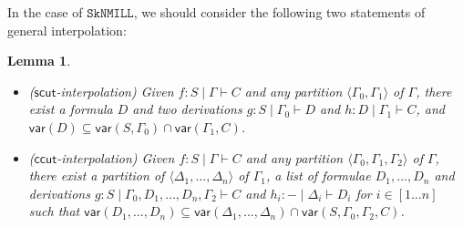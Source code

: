 \documentclass[sn-mathphys-num]{sn-jnl}%
\newcommand{\GG}{\Gamma}
\newcommand{\GD}{\Delta}
\newcommand{\vdG}{\vdash}
\newcommand{\SkNMILL}{$\mathtt{SkNMILL}$}
\newcommand{\mf}[1]{\mathsf{#1}}
\newcommand{\vars}[1]{\mathsf{var}(#1)}
\theoremstyle{thmstyleone}%
\theoremstyle{thmstyletwo}%
\newtheorem{lemma}{Lemma}
\theoremstyle{thmstylethree}%
\begin{document}
In the case of \SkNMILL, we should consider the following two statements of general interpolation:
\begin{lemma}
  \begin{itemize}
  \item[\ ] ($\mf{scut}$-interpolation) Given $f: S \mid \Gamma \vdG C$ and any partition $\langle \GG_0,\GG_1 \rangle$ of $\GG$, there exist a formula $D$ and two derivations $g : S \mid \GG_0 \vdG D$ and $h : D \mid \GG_1 \vdG C$, and $\vars{D} \subseteq \vars{S, \GG_0} \cap \vars{\GG_1, C}$.
  \item[\ ] ($\mf{ccut}$-interpolation) Given $f: S \mid \Gamma \vdG C$ and any partition $\langle \GG_0,\GG_1, \GG_2 \rangle$ of $\GG$, there exist a partition of $\langle \GD_1, \dots, \GD_n \rangle$ of $\GG_1$, a list of formulae $D_1, \dots, D_n$ and derivations $g: S \mid \GG_0, D_1, \dots, D_n, \GG_2 \vdG C$ and $h_i : {-} \mid \GD_i \vdG D_i$ for $i \in [1\dots n]$ such that $\vars{D_1, \dots, D_n} \subseteq \vars{\GD_1, \dots, \GD_n} \cap \vars{S, \GG_0, \GG_2, C}$.
\end{itemize}
\end{lemma}
\end{document}
